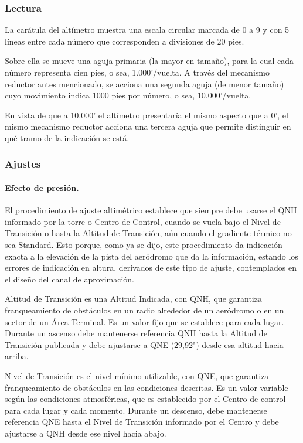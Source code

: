 \documentclass{article}
\begin{document}
\subsubsection*{Lectura}
La carátula del altímetro muestra una escala circular marcada de 0 a 9 y con 5 líneas entre cada número que corresponden a divisiones de 20 pies.

Sobre ella se mueve una aguja primaria (la mayor en tamaño), para la cual cada número representa cien pies, o sea, 1.000'/vuelta.
A través del mecanismo reductor antes mencionado, se acciona una segunda aguja (de menor tamaño) cuyo movimiento indica 1000 pies por número, o sea, 10.000'/vuelta.

En vista de que a 10.000' el altímetro presentaría el mismo aspecto que a 0', el mismo mecanismo reductor acciona una tercera aguja que permite distinguir en qué tramo de la indicación se está.


\subsubsection*{Ajustes}
\paragraph{Efecto de presión.}
El procedimiento de ajuste altimétrico establece que siempre debe usarse el QNH informado por la torre o Centro de Control, cuando se vuela bajo el Nivel de Transición o hasta la Altitud de Transición, aún cuando el gradiente térmico no sea Standard. Esto porque, como ya se dijo, este procedimiento da indicación exacta a la elevación de la pista del aeródromo que da la información, estando los errores de indicación en altura, derivados de este tipo de ajuste, contemplados en el diseño del canal de aproximación.

Altitud de Transición es una Altitud Indicada, con QNH, que garantiza franqueamiento de obstáculos en un radio alrededor de un aeródromo o en un sector de un Área Terminal. Es un valor fijo que se establece para cada lugar. Durante un ascenso debe mantenerse referencia QNH hasta la Altitud de Transición publicada y debe ajustarse a QNE (29,92") desde esa altitud hacia arriba.

Nivel de Transición es el nivel mínimo utilizable, con QNE, que garantiza franqueamiento de obstáculos en las condiciones descritas. Es un valor variable según las condiciones atmosféricas, que es establecido por el Centro de control para cada lugar y cada momento. Durante un descenso, debe mantenerse referencia QNE hasta el Nivel de Transición informado por el Centro y debe ajustarse a QNH desde ese nivel hacia abajo.
\end{document}
